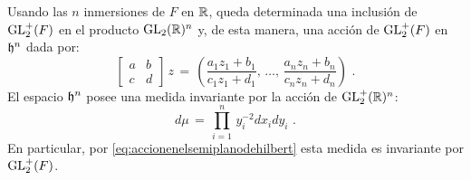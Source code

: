 Usando las $n$ inmersiones de $F$ en $\mathbb{R}$, queda determinada una
inclusi\'{o}n de $\mathrm{GL}^{+}_{2}(F)$ en el producto $\mathrm{GL}_{2}(\mathbb{R})^{n}$ y, de esta
manera, una acci\'{o}n de $\mathrm{GL}^{+}_{2}(F)$ en $\mathfrak{h}^{n}$ dada por:
\begin{equation}
	\label{eq:accionenelsemiplanodehilbert}
	\begin{bmatrix} a & b \\ c & d \end{bmatrix}\,z
		\,=\, \left(
		\frac{a_{1}z_{1}+b_{1}}{c_{1}z_{1}+d_{1}},\,\dots,\,
		\frac{a_{n}z_{n}+b_{n}}{c_{n}z_{n}+d_{n}}
		\right)
	\text{ .}
\end{equation}
%
El espacio $\mathfrak{h}^{n}$ posee una medida invariante por la acci\'{o}n de
$\mathrm{GL}^{+}_{2}(\mathbb{R})^{n}$:
\begin{equation}
	\label{eq:medidaenelsemiplanodehilbert}
	d\mu \,=\, \prod_{i=1}^{n}\,y_{i}^{-2}dx_{i}dy_{i}
	\text{ .}
\end{equation}
%
En particular, por \eqref{eq:accionenelsemiplanodehilbert} esta medida es
invariante por $\mathrm{GL}^{+}_{2}(F)$.

